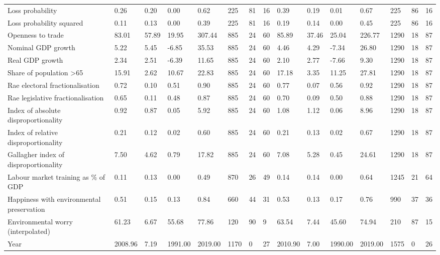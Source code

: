 \begin{longtable}{lllllllllllllll}
Loss probability & 0.26 & 0.20 & 0.00 & 0.62 & 225 & 81 & 16 & 0.39 & 0.19 & 0.01 & 0.67 & 225 & 86 & 16\\
\addlinespace
Loss probability squared & 0.11 & 0.13 & 0.00 & 0.39 & 225 & 81 & 16 & 0.19 & 0.14 & 0.00 & 0.45 & 225 & 86 & 16\\
Openness to trade & 83.01 & 57.89 & 19.95 & 307.44 & 885 & 24 & 60 & 85.89 & 37.46 & 25.04 & 226.77 & 1290 & 18 & 87\\
Nominal GDP growth & 5.22 & 5.45 & -6.85 & 35.53 & 885 & 24 & 60 & 4.46 & 4.29 & -7.34 & 26.80 & 1290 & 18 & 87\\
Real GDP growth & 2.34 & 2.51 & -6.39 & 11.65 & 885 & 24 & 60 & 2.10 & 2.77 & -7.66 & 9.30 & 1290 & 18 & 87\\
Share of population >65 & 15.91 & 2.62 & 10.67 & 22.83 & 885 & 24 & 60 & 17.18 & 3.35 & 11.25 & 27.81 & 1290 & 18 & 87\\
\addlinespace
Rae electoral fractionalisation & 0.72 & 0.10 & 0.51 & 0.90 & 885 & 24 & 60 & 0.77 & 0.07 & 0.56 & 0.92 & 1290 & 18 & 87\\
Rae legislative fractionalisation & 0.65 & 0.11 & 0.48 & 0.87 & 885 & 24 & 60 & 0.70 & 0.09 & 0.50 & 0.88 & 1290 & 18 & 87\\
Index of absolute disproportionality & 0.92 & 0.87 & 0.05 & 5.92 & 885 & 24 & 60 & 1.08 & 1.12 & 0.06 & 8.96 & 1290 & 18 & 87\\
Index of relative disproportionality & 0.21 & 0.12 & 0.02 & 0.60 & 885 & 24 & 60 & 0.21 & 0.13 & 0.02 & 0.67 & 1290 & 18 & 87\\
Gallagher index of disproportionality & 7.50 & 4.62 & 0.79 & 17.82 & 885 & 24 & 60 & 7.08 & 5.28 & 0.45 & 24.61 & 1290 & 18 & 87\\
\addlinespace
Labour market training as \% of GDP & 0.11 & 0.13 & 0.00 & 0.49 & 870 & 26 & 49 & 0.14 & 0.14 & 0.00 & 0.64 & 1245 & 21 & 64\\
Happiness with environmental preservation & 0.51 & 0.15 & 0.13 & 0.84 & 660 & 44 & 31 & 0.53 & 0.13 & 0.17 & 0.76 & 990 & 37 & 36\\
Environmental worry (interpolated) & 61.23 & 6.67 & 55.68 & 77.86 & 120 & 90 & 9 & 63.54 & 7.44 & 45.60 & 74.94 & 210 & 87 & 15\\
Year & 2008.96 & 7.19 & 1991.00 & 2019.00 & 1170 & 0 & 27 & 2010.90 & 7.00 & 1990.00 & 2019.00 & 1575 & 0 & 26\\
\bottomrule
\end{longtable}
